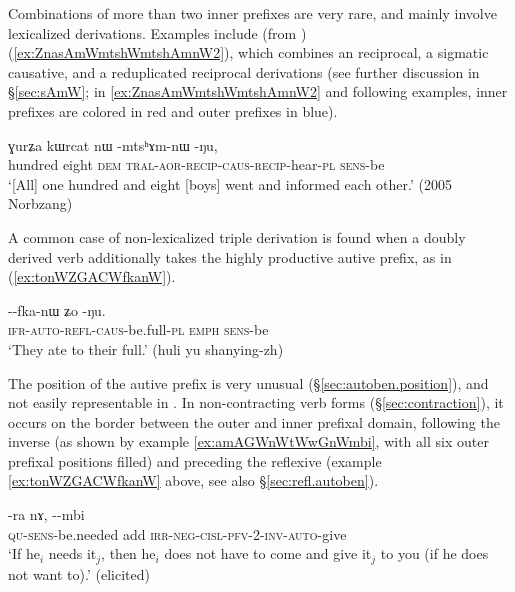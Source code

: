 Combinations of more than two inner prefixes are very rare, and mainly involve lexicalized derivations. Examples include (from ) (\ref{ex:ZnasAmWmtshWmtshAmnW2}), which combines an reciprocal, a sigmatic causative, and a reduplicated reciprocal derivations (see further discussion in §\ref{sec:sAmW}; in \ref{ex:ZnasAmWmtshWmtshAmnW2} and following examples, inner prefixes are colored in red and outer prefixes in blue).

\begin{exe}
\ex \label{ex:ZnasAmWmtshWmtshAmnW2}
\gll  ɣurʑa kɯrcat nɯ -mtsʰɤm-nɯ -ŋu, \\
 hundred eight \textsc{dem} \textsc{tral}-\textsc{aor}-\textsc{recip}-\textsc{caus}-\textsc{recip}-hear-\textsc{pl} \textsc{sens}-be \\
\glt `[All] one hundred and eight [boys] went and informed each other.' (2005 Norbzang)
\end{exe}

 A common case of non-lexicalized triple derivation is found when a doubly derived verb additionally takes the highly productive autive prefix, as in (\ref{ex:tonWZGACWfkanW}).


\begin{exe}
\ex \label{ex:tonWZGACWfkanW}
\gll   {}--fka-nɯ ʑo -ŋu. \\
  \textsc{ifr}-\textsc{auto}-\textsc{refl}-\textsc{caus}-be.full-\textsc{pl} \textsc{emph} \textsc{sens}-be \\
\glt `They ate to their full.' (huli yu shanying-zh)
\end{exe}

The position of the autive prefix is very unusual (§\ref{sec:autoben.position}), and not easily representable in . In non-contracting verb forms (§\ref{sec:contraction}), it occurs on the border between the outer and inner prefixal domain, following the inverse (as shown by example \ref{ex:amAGWnWtWwGnWmbi}, with all six outer prefixal positions filled) and preceding the reflexive  (example \ref{ex:tonWZGACWfkanW} above, see also §\ref{sec:refl.autoben}). 

\begin{exe}
\ex \label{ex:amAGWnWtWwGnWmbi}
\gll {}-ra nɤ, --mbi \\
\textsc{qu}-\textsc{sens}-be.needed add \textsc{irr}-\textsc{neg}-\textsc{cisl}-\textsc{pfv}-2-\textsc{inv}-\textsc{auto}-give \\
\glt `If he$_i$ needs it$_j$, then he$_i$ does not have to come and give it$_j$ to you (if he does not want to).' (elicited) 
\end{exe}

